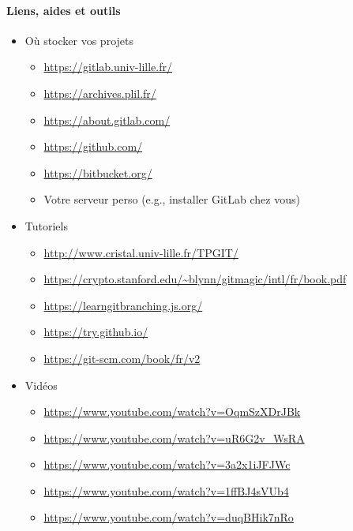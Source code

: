 \documentclass[final, a4paper, openbib, ]{article}
\begin{document}
\paragraph{Liens, aides et outils}
\begin{itemize}
	\item Où stocker vos projets
	\begin{itemize}
		\item \url{https://gitlab.univ-lille.fr/}	
		\item \url{https://archives.plil.fr/}
		\item \url{https://about.gitlab.com/}
		\item \url{https://github.com/}
		\item \url{https://bitbucket.org/}
		\item Votre serveur perso (e.g., installer GitLab chez vous)
	\end{itemize}
	\item Tutoriels
	\begin{itemize}
		\item \url{http://www.cristal.univ-lille.fr/TPGIT/}
		\item \url{https://crypto.stanford.edu/~blynn/gitmagic/intl/fr/book.pdf}
		\item \url{https://learngitbranching.js.org/}
		\item \url{https://try.github.io/}
		\item \url{https://git-scm.com/book/fr/v2}
	\end{itemize}
	\item Vidéos
	\begin{itemize}
		\item \url{https://www.youtube.com/watch?v=OqmSzXDrJBk}
		\item \url{https://www.youtube.com/watch?v=uR6G2v_WsRA}
		\item \url{https://www.youtube.com/watch?v=3a2x1iJFJWc}
		\item \url{https://www.youtube.com/watch?v=1ffBJ4sVUb4}
		\item \url{https://www.youtube.com/watch?v=duqBHik7nRo}
	\end{itemize}
\end{itemize}
\end{document}
